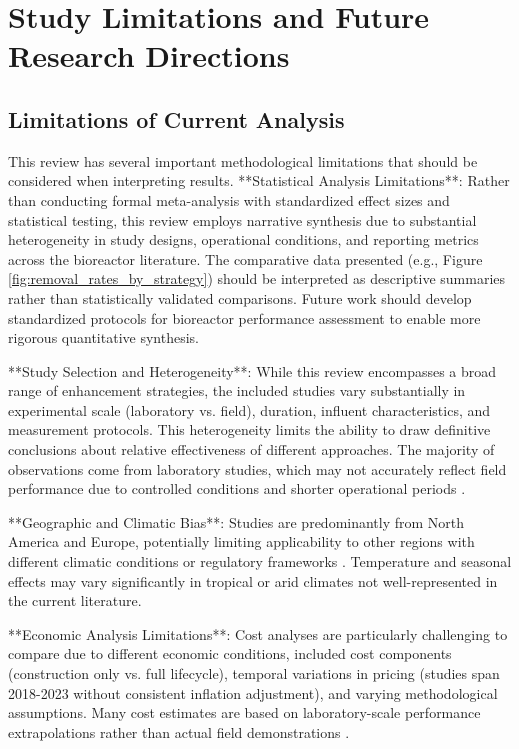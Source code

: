 \documentclass[12pt,a4paper]{article}
\begin{document}
\section{Study Limitations and Future Research Directions}

\subsection{Limitations of Current Analysis}

This review has several important methodological limitations that should be considered when interpreting results. **Statistical Analysis Limitations**: Rather than conducting formal meta-analysis with standardized effect sizes and statistical testing, this review employs narrative synthesis due to substantial heterogeneity in study designs, operational conditions, and reporting metrics across the bioreactor literature. The comparative data presented (e.g., Figure \ref{fig:removal_rates_by_strategy}) should be interpreted as descriptive summaries rather than statistically validated comparisons. Future work should develop standardized protocols for bioreactor performance assessment to enable more rigorous quantitative synthesis.

**Study Selection and Heterogeneity**: While this review encompasses a broad range of enhancement strategies, the included studies vary substantially in experimental scale (laboratory vs. field), duration, influent characteristics, and measurement protocols. This heterogeneity limits the ability to draw definitive conclusions about relative effectiveness of different approaches. The majority of observations come from laboratory studies, which may not accurately reflect field performance due to controlled conditions and shorter operational periods \citep{RN312}.

**Geographic and Climatic Bias**: Studies are predominantly from North America and Europe, potentially limiting applicability to other regions with different climatic conditions or regulatory frameworks \citep{RN1023, RN258}. Temperature and seasonal effects may vary significantly in tropical or arid climates not well-represented in the current literature.

**Economic Analysis Limitations**: Cost analyses are particularly challenging to compare due to different economic conditions, included cost components (construction only vs. full lifecycle), temporal variations in pricing (studies span 2018-2023 without consistent inflation adjustment), and varying methodological assumptions. Many cost estimates are based on laboratory-scale performance extrapolations rather than actual field demonstrations \citep{RN312}.
\end{document}
